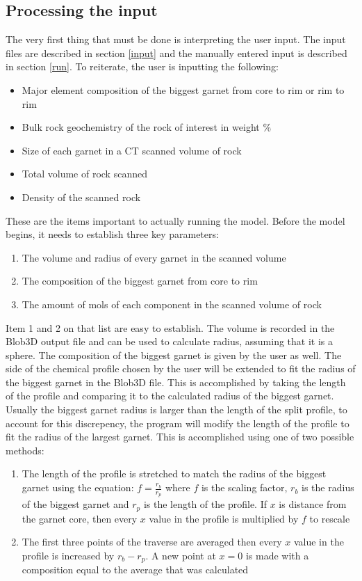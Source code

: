 \documentclass[12pt]{article}
\begin{document}
\subsection{Processing the input}
The very first thing that must be done is interpreting the user input. The input files are described in section \ref{input} and the manually entered input is described in section \ref{run}. To reiterate, the user is inputting the following:
\begin{itemize}
\item[--] Major element composition of the biggest garnet from core to rim or rim to rim
\item[--] Bulk rock geochemistry of the rock of interest in weight \%
\item[--] Size of each garnet in a CT scanned volume of rock
\item[--] Total volume of rock scanned
\item[--] Density of the scanned rock
\end{itemize}
These are the items important to actually running the model. Before the model begins, it needs to establish three key parameters:
\begin{enumerate}
\item The volume and radius of every garnet in the scanned volume
\item The composition of the biggest garnet from core to rim
\item The amount of mols of each component in the scanned volume of rock
\end{enumerate}
Item 1 and 2 on that list are easy to establish. The volume is recorded in the Blob3D output file and can be used to calculate radius, assuming that it is a sphere. The composition of the biggest garnet is given by the user as well. The side of the chemical profile chosen by the user will be extended to fit the radius of the biggest garnet in the Blob3D file. This is accomplished by taking the length of the profile and comparing it to the calculated radius of the biggest garnet. Usually the biggest garnet radius is larger than the length of the split profile, to account for this discrepency, the program will modify the length of the profile to fit the radius of the largest garnet. This is accomplished using one of two possible methods:
\begin{enumerate}
\item The length of the profile is stretched to match the radius of the biggest garnet using the equation: $f = \frac{r_b}{r_p}$ where $f$ is the scaling factor, $r_b$ is the radius of the biggest garnet and $r_p$ is the length of the profile. If $x$ is distance from the garnet core, then every $x$ value in the profile is multiplied by $f$ to rescale 
\item The first three points of the traverse are averaged then every $x$ value in the profile is increased by $r_b-r_p$. A new point at $x=0$ is made with a composition equal to the average that was calculated
\end{enumerate}
\end{document}
